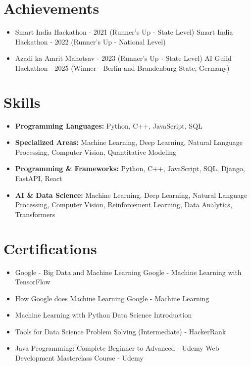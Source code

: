 \documentclass[a4paper,10pt]{article}
\begin{document}
\section*{Achievements}
\begin{itemize}
\item Smart India Hackathon - 2021 (Runner's Up - State Level) \hfill Smart India Hackathon - 2022 (Runner's Up - National Level)
\item Azadi ka Amrit Mahotsav - 2023 (Runner's Up - State Level) \hfill AI Guild Hackathon - 2025 (Winner - Berlin and Brandenburg State, Germany)
\end{itemize}

\section*{Skills}
\begin{itemize}
  \item \textbf{Programming Languages:} Python, C++, JavaScript, SQL
  \item \textbf{Specialized Areas:} Machine Learning, Deep Learning, Natural Language Processing, Computer Vision, Quantitative Modeling
  \item \textbf{Programming \& Frameworks:} Python, C++, JavaScript, SQL, Django, FastAPI, React
  \item \textbf{AI \& Data Science:} Machine Learning, Deep Learning, Natural Language Processing, Computer Vision, Reinforcement Learning, Data Analytics, Transformers
\end{itemize}

\section*{Certifications}
\begin{itemize}
\item Google - Big Data and Machine Learning \hfill Google - Machine Learning with TensorFlow
\item How Google does Machine Learning \hfill Google - Machine Learning
\item Machine Learning with Python \hfill Data Science Introduction
\item Tools for Data Science \hfill Problem Solving (Intermediate) - HackerRank
\item Java Programming: Complete Beginner to Advanced - Udemy \hfill Web Development Masterclass Course - Udemy
\end{itemize}
\end{document}
